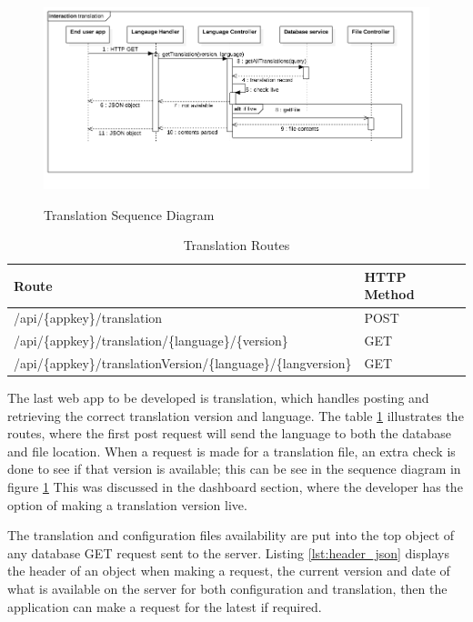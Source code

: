 \begin{figure}[!h]
    \caption{Translation Sequence Diagram}
    \centering
    \includegraphics[width=150mm]{images/sequence/translation}
    \label{fig:translation-s}
\end{figure}

\begin{table}[!h]
\centering
\caption{Translation Routes}
\label{tb:translation-routes}
\begin{tabular}{|l|l|}
\hline
\rowcolor{green!20}
Route                                        & HTTP Method \\ \hline
/api/\{appkey\}/translation                  & POST        \\ \hline
/api/\{appkey\}/translation/\{language\}/\{version\}           & GET         \\ \hline
/api/\{appkey\}/translationVersion/\{language\}/\{langversion\} & GET         \\ \hline
\end{tabular}
\end{table}

The last web app to be developed is translation, which handles posting and retrieving the correct translation version and language. The table \ref{tb:translation-routes} illustrates the routes, where the first post request will send the language to both the database and file location. When a request is made for a translation file, an extra check is done to see if that version is available; this can be see in the sequence diagram in figure \ref{fig:translation-s} This was discussed in the dashboard section, where the developer has the option of making a translation version live.

The translation and configuration files availability are put into the top object of any database GET request sent to the server. Listing \ref{lst:header_json} displays the header of an object when making a request, the current version and date of what is available on the server for both configuration and translation, then the application can make a request for the latest if required.

